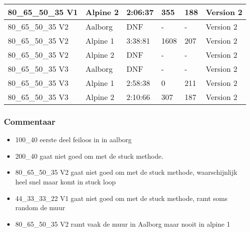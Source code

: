 \documentclass[a4paper,10pt]{scrartcl}
\begin{document}
\begin{table}[H]
\begin{tabular}{llllll}
 80\_65\_50\_35 V1 & Alpine 2 & 2:06:37 & 355 & 188 & Version 2 \\ \hline
 80\_65\_50\_35 V2 & Aalborg & DNF & - & - & Version 2 \\
 80\_65\_50\_35 V2 & Alpine 1 & 3:38:81 & 1608 & 207 & Version 2 \\
 80\_65\_50\_35 V2 & Alpine 2 & DNF & - & - & Version 2 \\ \hline 
 80\_65\_50\_35 V3 & Aalborg & DNF & - & - & Version 2 \\
 80\_65\_50\_35 V3 & Alpine 1 & 2:58:38 & 0 & 211 & Version 2 \\
 80\_65\_50\_35 V3 & Alpine 2 & 2:10:66 & 307 & 187 & Version 2 \\ \hline
\end{tabular}
\end{table}
\subsubsection*{Commentaar}
\begin{itemize}
 \setlength\itemsep{0.1em}
\item 100\_40 eerste deel feiloos in in aalborg
\item 200\_40 gaat niet goed om met de stuck methode.
\item 80\_65\_50\_35 V2 gaat niet goed om met de stuck methode, waarschijnlijk heel snel maar komt in stuck loop
\item 44\_33\_33\_22 V1 gaat niet goed om met de stuck methode, ramt soms random de muur \
\item  80\_65\_50\_35 V2 ramt vaak de muur in Aalborg maar nooit in alpine 1
\end{itemize}


\newpage
\end{document}
